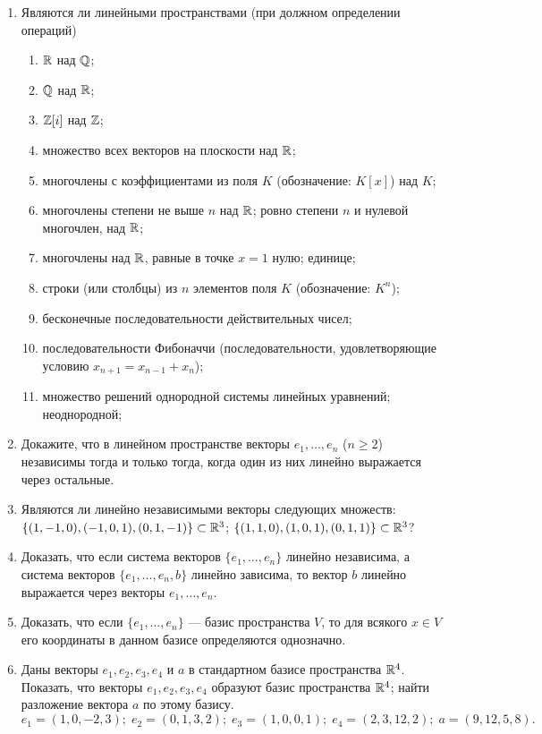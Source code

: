 \begin{enumerate}
\item \label{Mod} Являются ли линейными пространствами (при должном определении операций)
\begin{enumerate}
\item $\mathbb R$ над $\mathbb Q$; 
\item $\mathbb Q$ над $\mathbb R$;
\item $\mathbb Z[i]$ над $\mathbb Z$;
\item множество всех векторов на плоскости над $\mathbb R$;
\item многочлены с коэффициентами из поля $K$ (обозначение: $K[x]$) над $K$;
\item многочлены степени не выше $n$ над $\mathbb R$; ровно степени $n$ и нулевой многочлен, над $\mathbb R$;
\item многочлены над $\mathbb R$, равные в точке $x = 1$ нулю; единице;
\item строки (или столбцы) из $n$ элементов поля $K$ (обозначение: $K^n$);
\item бесконечные последовательности действительных чисел;
\item последовательности Фибоначчи (последовательности, удовлетворяющие условию $x_{n+1} = x_{n-1}+x_n$);
\item множество решений однородной системы линейных уравнений; неоднородной;
\end{enumerate}

\item Докажите, что в линейном пространстве векторы $e_1,\dots,e_n$ ($n\ge 2$) независимы тогда и только тогда, когда один из них линейно выражается через остальные.

\item Являются ли линейно независимыми векторы следующих множеств:
\ipunkt $\{(1, -1, 0), (-1, 0, 1), (0, 1, -1)\} \subset \mathbb R^3$;
\ipunkt $\{(1, 1, 0), (1, 0, 1), (0, 1, 1)\} \subset \mathbb R^3$?

\item Доказать, что если система векторов $\{e_1,\dots, e_n\}$ линейно независима, а система векторов
$\{e_1,\dots, e_n, b\}$ линейно зависима, то вектор $b$ линейно выражается через векторы $e_1,\dots,e_n$.

\item Доказать, что если $\{e_1,\dots,e_n\}$ --- базис пространства $V$, то для всякого $x\in V$ его координаты в данном базисе определяются однозначно.

\item Даны векторы $e_1,e_2,e_3,e_4$ и $a$ в стандартном базисе пространства $\mathbb R^4$.
Показать, \ipunkt что векторы $e_1,e_2,e_3,e_4$ образуют базис пространства $\mathbb R^4$;
\ipunkt найти разложение вектора $a$ по этому базису.
$$
e_1=(1,0,-2,3);\; e_2=(0,1,3,2);\; e_3=(1,0,0,1);\; e_4=(2,3,12,2);\; a=(9,12,5,8).
$$


\end{enumerate}
